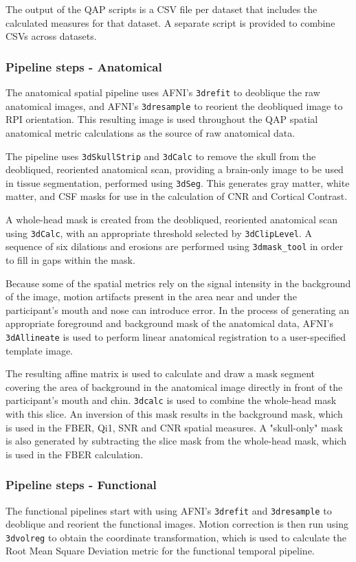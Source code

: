 The output of the QAP scripts is a CSV file per dataset that includes the calculated measures for that dataset. A separate script is provided to combine  CSVs across datasets. 

\subsubsection{Pipeline steps - Anatomical}
\label{sec:21}
The anatomical spatial pipeline uses AFNI's \texttt{3drefit} to deoblique the raw anatomical images, and AFNI's \texttt{3dresample} to reorient the deobliqued image to RPI orientation. This resulting image is used throughout the QAP spatial anatomical metric calculations as the source of raw anatomical data.

The pipeline uses \texttt{3dSkullStrip} and \texttt{3dCalc} to remove the skull from the deobliqued, reoriented anatomical scan, providing a brain-only image to be used in tissue segmentation, performed using \texttt{3dSeg}. This generates gray matter, white matter, and CSF masks for use in the calculation of CNR and Cortical Contrast.

A whole-head mask is created from the deobliqued, reoriented anatomical scan using \texttt{3dCalc}, with an appropriate threshold selected by \texttt{3dClipLevel}. A sequence of six dilations and erosions are performed using \texttt{3dmask\_tool} in order to fill in gaps within the mask.

Because some of the spatial metrics rely on the signal intensity in the background of the image, motion artifacts present in the area near and under the participant's mouth and nose can introduce error. In the process of generating an appropriate foreground and background mask of the anatomical data, AFNI's \texttt{3dAllineate} is used to perform linear anatomical registration to a user-specified template image.

The resulting affine matrix is used to calculate and draw a mask segment covering the area of background in the anatomical image directly in front of the participant's mouth and chin. \texttt{3dcalc} is used to combine the whole-head mask with this slice. An inversion of this mask results in the background mask, which is used in the FBER, Qi1, SNR and CNR spatial measures. A "skull-only" mask is also generated by subtracting the slice mask from the whole-head mask, which is used in the FBER calculation.

\subsubsection{Pipeline steps - Functional}
The functional pipelines start with using AFNI's \texttt{3drefit} and \texttt{3dresample} to deoblique and reorient the functional images. Motion correction is then run using \texttt{3dvolreg} to obtain the coordinate transformation, which is used to calculate the Root Mean Square Deviation metric for the functional temporal pipeline. 

